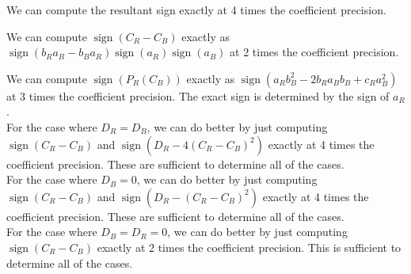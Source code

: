 \documentclass{article}
\DeclareMathOperator{\sign}{sign}
\begin{document}
\noindent
We can compute the resultant sign exactly at 4 times the coefficient
precision.

\noindent
We can compute $\sign(C_R-C_B)$ exactly as $\sign(b_R a_B - b_B
a_R)\sign(a_R)\sign(a_B)$ at 2 times the coefficient precision.

\noindent
We can compute $\sign(P_R(C_B))$ exactly as $\sign(a_R b_B^2 - 2 b_R
a_B b_B + c_R a_B^2)$ at 3 times the coefficient precision.  The exact
sign is determined by the sign of $a_R$.\\

\noindent
For the case where $D_R=D_B$, we can do better by just computing
$\sign(C_R-C_B)$ and $\sign(D_R-4(C_R-C_B)^2)$ exactly at 4 times the
coefficient precision. These are sufficient to determine all of the
cases.\\

\noindent
For the case where $D_B=0$, we can do better by just computing
$\sign(C_R-C_B)$ and $\sign(D_R-(C_R-C_B)^2)$ exactly at 4 times the
coefficient precision. These are sufficient to determine all of the
cases.\\

\noindent
For the case where $D_B=D_R=0$, we can do better by just computing
$\sign(C_R-C_B)$ exactly at 2 times the coefficient precision. This is
sufficient to determine all of the cases.
\end{document}
